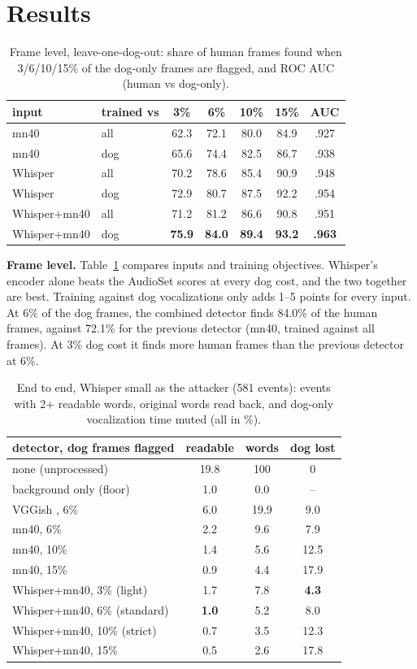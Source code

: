 \documentclass[10pt,twocolumn,a4paper]{article}
\begin{document}
\section{Results}
\label{sec:results}
\begin{table}[t]
\centering\small
\caption{Frame level, leave-one-dog-out: share of human frames found when 3/6/10/15\% of the dog-only
frames are flagged, and ROC AUC (human vs dog-only).}
\label{tab:frames}
\begin{tabular}{@{}llccccc@{}}
\toprule
input & trained vs & 3\% & 6\% & 10\% & 15\% & AUC\\
\midrule
mn40 & all & 62.3 & 72.1 & 80.0 & 84.9 & .927\\
mn40 & dog & 65.6 & 74.4 & 82.5 & 86.7 & .938\\
Whisper & all & 70.2 & 78.6 & 85.4 & 90.9 & .948\\
Whisper & dog & 72.9 & 80.7 & 87.5 & 92.2 & .954\\
Whisper+mn40 & all & 71.2 & 81.2 & 86.6 & 90.8 & .951\\
Whisper+mn40 & dog & \textbf{75.9} & \textbf{84.0} & \textbf{89.4} & \textbf{93.2} & \textbf{.963}\\
\bottomrule
\end{tabular}
\end{table}

\textbf{Frame level.} Table~\ref{tab:frames} compares inputs and training objectives. Whisper's encoder
alone beats the AudioSet scores at every dog cost, and the two together are best. Training against dog
vocalizations only adds 1--5 points for every input. At 6\% of the dog frames, the combined detector
finds 84.0\% of the human frames, against 72.1\% for the previous detector (mn40, trained against all
frames). At 3\% dog cost it finds more human frames than the previous detector at 6\%.

\begin{table}[t]
\centering\small
\caption{End to end, Whisper small as the attacker (581 events): events with 2+ readable words,
original words read back, and dog-only vocalization time muted (all in \%).}
\label{tab:e2e}
\begin{tabular}{@{}lccc@{}}
\toprule
detector, dog frames flagged & readable & words & dog lost\\
\midrule
none (unprocessed) & 19.8 & 100 & 0\\
background only (floor) & 1.0 & 0.0 & --\\
\midrule
VGGish \cite{hershey2017vggish}, 6\% & 6.0 & 19.9 & 9.0\\
mn40, 6\% & 2.2 & 9.6 & 7.9\\
mn40, 10\% & 1.4 & 5.6 & 12.5\\
mn40, 15\% & 0.9 & 4.4 & 17.9\\
\midrule
Whisper+mn40, 3\% (light) & 1.7 & 7.8 & \textbf{4.3}\\
Whisper+mn40, 6\% (standard) & \textbf{1.0} & 5.2 & 8.0\\
Whisper+mn40, 10\% (strict) & 0.7 & 3.5 & 12.3\\
Whisper+mn40, 15\% & 0.5 & 2.6 & 17.8\\
\bottomrule
\end{tabular}
\end{table}
\end{document}
